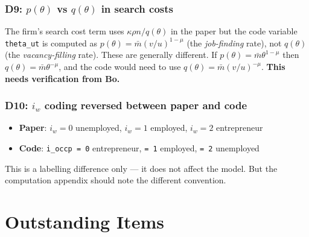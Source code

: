 \documentclass[11pt]{article}
\begin{document}
\subsubsection*{D9: $p(\theta)$ vs $q(\theta)$ in search costs}

The firm's search cost term uses $\kappa\rho n / q(\theta)$ in the paper but the code variable \texttt{theta\_ut} is computed as $p(\theta) = \bar{m}(v/u)^{1-\mu}$ (the \emph{job-finding} rate), not $q(\theta)$ (the \emph{vacancy-filling} rate). These are generally different. If $p(\theta) = \bar{m}\theta^{1-\mu}$ then $q(\theta) = \bar{m}\theta^{-\mu}$, and the code would need to use $q(\theta) = \bar{m}(v/u)^{-\mu}$. \textbf{This needs verification from Bo.}

\subsubsection*{D10: $i_w$ coding reversed between paper and code}

\begin{itemize}
    \item \textbf{Paper}: $i_w = 0$ unemployed, $i_w = 1$ employed, $i_w = 2$ entrepreneur
    \item \textbf{Code}: \texttt{i\_occp = 0} entrepreneur, \texttt{= 1} employed, \texttt{= 2} unemployed
\end{itemize}
This is a labelling difference only --- it does not affect the model. But the computation appendix should note the different convention.

\section*{Outstanding Items}
\end{document}
